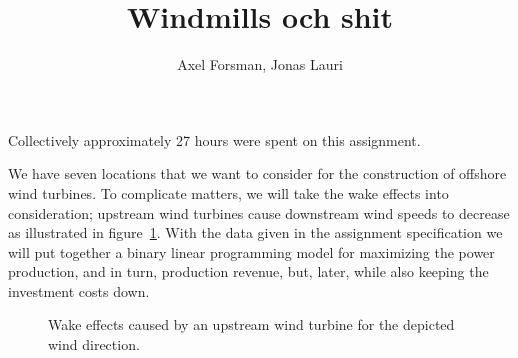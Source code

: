 \documentclass{article}
\title{Windmills och shit}
\author{Axel Forsman, Jonas Lauri}
\begin{document}
\maketitle
Collectively approximately 27 hours were spent on this assignment.

We have seven locations that we want to consider for
the construction of offshore wind turbines.
To complicate matters, we will take the wake effects into consideration;
upstream wind turbines cause downstream wind speeds to decrease
as illustrated in figure~\ref{fig:wake_effects}.
With the data given in the assignment specification we will put together
a binary linear programming model for maximizing the power production,
and in turn, production revenue,
but, later, while also keeping the investment costs down.

\begin{figure}
	\centering
	\def\svgwidth{0.7\textwidth}
	
	\caption{Wake effects caused by an upstream wind turbine for the depicted wind direction. \label{fig:wake_effects}}
\end{figure}
\end{document}

